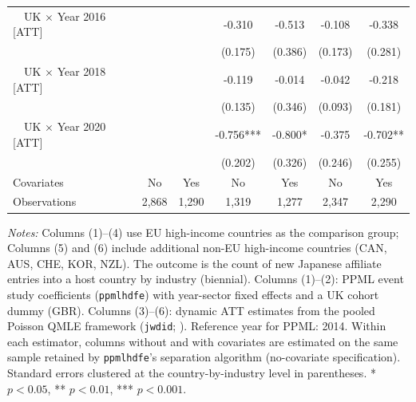 \begin{table}[!ht]
\begin{threeparttable}
\begin{tabular}{l*{6}{c}}
~~UK $\times$ Year 2016 [ATT]&               &               &      -0.310   &      -0.513   &      -0.108   &      -0.338   \\
                    &               &               &     (0.175)   &     (0.386)   &     (0.173)   &     (0.281)   \\
~~UK $\times$ Year 2018 [ATT]&               &               &      -0.119   &      -0.014   &      -0.042   &      -0.218   \\
                    &               &               &     (0.135)   &     (0.346)   &     (0.093)   &     (0.181)   \\
~~UK $\times$ Year 2020 [ATT]&               &               &      -0.756***&      -0.800*  &      -0.375   &      -0.702** \\
                    &               &               &     (0.202)   &     (0.326)   &     (0.246)   &     (0.255)   \\
\midrule
Covariates          &          No   &         Yes   &          No   &         Yes   &          No   &         Yes   \\
Observations        &       2,868   &       1,290   &       1,319   &       1,277   &       2,347   &       2,290   \\
\bottomrule\end{tabular}\end{threeparttable}\par\medskip\parbox{\linewidth}{\footnotesize \textit{Notes:}  Columns (1)--(4) use EU high-income countries as the comparison group; Columns (5) and (6) include additional non-EU high-income countries (CAN, AUS, CHE, KOR, NZL). The outcome is the count of new Japanese affiliate entries into a host country by industry (biennial). Columns (1)--(2): PPML event study coefficients (\texttt{ppmlhdfe}) with year-sector fixed effects and a UK cohort dummy (GBR). Columns (3)--(6): dynamic ATT estimates from the pooled Poisson QMLE framework (\texttt{jwdid}; \citealt{wooldridge2023simple}). Reference year for PPML: 2014. Within each estimator, columns without and with covariates are estimated on the same sample retained by \texttt{ppmlhdfe}'s separation algorithm (no-covariate specification). Standard errors clustered at the country-by-industry level in parentheses. * $p<0.05$, ** $p<0.01$, *** $p<0.001$. }\end{table}
